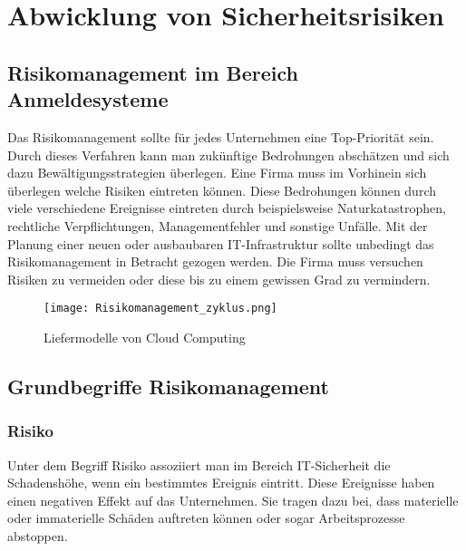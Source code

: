 \chapter{Abwicklung von Sicherheitsrisiken}

\section{Risikomanagement im Bereich Anmeldesysteme}
Das Risikomanagement sollte für jedes Unternehmen eine Top-Priorität sein. Durch dieses Verfahren kann man zukünftige Bedrohungen abschätzen und sich dazu Bewältigungsstrategien überlegen. Eine Firma muss im Vorhinein sich überlegen welche Risiken eintreten können. Diese Bedrohungen können durch viele verschiedene Ereignisse eintreten durch beispielsweise Naturkatastrophen, rechtliche Verpflichtungen, Managementfehler und sonstige Unfälle.
Mit der Planung einer neuen oder ausbaubaren IT-Infrastruktur sollte unbedingt das Risikomanagement in Betracht gezogen werden. Die Firma muss versuchen Risiken zu vermeiden oder diese bis zu einem gewissen Grad zu vermindern. 

\begin{center}
\begin{figure}[h]
    \centering
    \texttt{[image: Risikomanagement\_zyklus.png]}
    \caption{Liefermodelle von Cloud Computing}
\end{figure}
\end{center}

\newpage

\section{Grundbegriffe Risikomanagement}
\subsection{Risiko}
Unter dem Begriff Risiko assoziiert man im Bereich IT-Sicherheit die Schadenshöhe, wenn ein bestimmtes Ereignis eintritt. Diese Ereignisse haben einen negativen Effekt auf das Unternehmen. Sie tragen dazu bei, dass materielle oder immaterielle Schäden auftreten können oder sogar Arbeitsprozesse abstoppen.
\\

